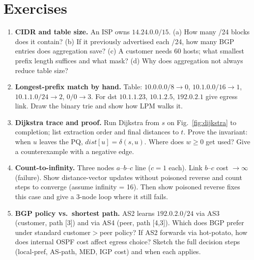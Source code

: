 \section{Exercises}\label{sec:ch05-exercises}
\begin{enumerate}[label=E5.\arabic*, leftmargin=*, itemsep=0.7em]
    \item \textbf{CIDR and table size.} An ISP owns $14.24.0.0/15$. (a) How many /24 blocks does it contain? (b) If it previously advertised each /24, how many BGP entries does aggregation save? (c) A customer needs 60 hosts; what smallest prefix length suffices and what mask? (d) Why does aggregation not always reduce table size?
    \item \textbf{Longest-prefix match by hand.} Table: $10.0.0.0/8\to0$, $10.1.0.0/16\to1$, $10.1.1.0/24\to2$, $0/0\to3$. For dst $10.1.1.23$, $10.1.2.5$, $192.0.2.1$ give egress link. Draw the binary trie and show how LPM walks it.
    \item \textbf{Dijkstra trace and proof.} Run Dijkstra from $s$ on Fig.~\ref{fig:dijkstra} to completion; list extraction order and final distances to $t$. Prove the invariant: when $u$ leaves the PQ, $\mathit{dist}[u]=\delta(s,u)$. Where does $w\ge0$ get used? Give a counterexample with a negative edge.
    \item \textbf{Count-to-infinity.} Three nodes $a$--$b$--$c$ line ($c=1$ each). Link $b$--$c$ cost $\to\infty$ (failure). Show distance-vector updates without poisoned reverse and count steps to converge (assume infinity = 16). Then show poisoned reverse fixes this case and give a 3-node loop where it still fails.
    \item \textbf{BGP policy vs.\ shortest path.} AS2 learns $192.0.2.0/24$ via AS3 (customer, path [3]) and via AS4 (peer, path [4,3]). Which does BGP prefer under standard customer$>$peer policy? If AS2 forwards via hot-potato, how does internal OSPF cost affect egress choice? Sketch the full decision steps (local-pref, AS-path, MED, IGP cost) and when each applies.
\end{enumerate}

